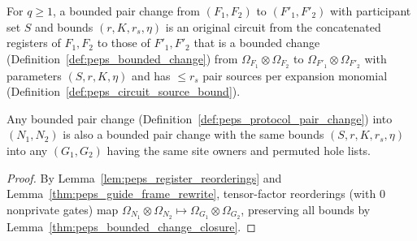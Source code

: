 \begin{definition}
    \label{def:peps_protocol_pair_change}
    \leanok
    For $q\ge1$, a bounded pair change from $(F_1,F_2)$ to $(F'_1,F'_2)$ with participant set $S$ and bounds $(r,K,r_s,\eta)$ is an original circuit from the concatenated registers of $F_1,F_2$ to those of $F'_1,F'_2$ that is a bounded change (Definition~\ref{def:peps_bounded_change}) from $\Omega_{F_1}\otimes\Omega_{F_2}$ to $\Omega_{F'_1}\otimes\Omega_{F'_2}$ with parameters $(S,r,K,\eta)$ and has $\le r_s$ pair sources per expansion monomial (Definition~\ref{def:peps_circuit_source_bound}).
\end{definition}

\begin{lemma}
    \label{thm:peps_pair_change_reorder}
    \leanok
    Any bounded pair change (Definition~\ref{def:peps_protocol_pair_change}) into $(N_1,N_2)$ is also a bounded pair change with the same bounds $(S,r,K,r_s,\eta)$ into any $(G_1,G_2)$ having the same site owners and permuted hole lists.
\end{lemma}

\begin{proof}\leanok
    By Lemma~\ref{lem:peps_register_reorderings} and Lemma~\ref{thm:peps_guide_frame_rewrite}, tensor-factor reorderings (with $0$ nonprivate gates) map $\Omega_{N_1}\otimes\Omega_{N_2}\mapsto\Omega_{G_1}\otimes\Omega_{G_2}$, preserving all bounds by Lemma~\ref{thm:peps_bounded_change_closure}.
\end{proof}

